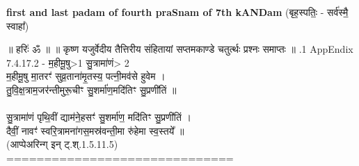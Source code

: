 \documentclass[17pt]{extarticle}
\begin{document}
        \textbf{first and last padam of fourth praSnam of 7th kANDam} \newline
        (बृह॒स्पतिः॒ - सर्व॑स्मै॒ स्वाहा᳚) \newline 

        
        ॥ हरिः॑ ॐ ॥
॥ कृष्ण यजुर्वेदीय तैत्तिरीय संहितायां सप्तमकाण्डे चतुर्त्थः प्रश्नः समाप्तः ॥ \newline
        .1   AppEndix\\7.4.17.2 - म॒हीमू॒षु>1 सु॒त्रामा॑णं> 2 \\म॒हीमू॒षु मा॒तरꣳ॑ सुव्र॒ताना॑मृ॒तस्य॒ पत्नी॒मव॑से हुवेम । \\तु॒वि॒क्ष॒त्राम॒जर॑न्तीमुरू॒चीꣳ सु॒शर्मा॑ण॒मदि॑तिꣳ सु॒प्रणी॑तिं ॥ \\\\सु॒त्रामा॑णं पृथि॒वीं द्याम॑ने॒हसꣳ॑ सु॒शर्मा॑ण॒ मदि॑तिꣳ सु॒प्रणी॑तिं । \\दैवीं॒ नावꣳ॑ स्वरि॒त्रामना॑गस॒मस्र॑वन्ती॒मा रु॑हेमा स्व॒स्तये᳚ ॥ \\(आप्पेअरिन्ग् इन् ट्.श्.1.5.11.5)\\==============================\\
                \pagebreak
        
\end{document}
